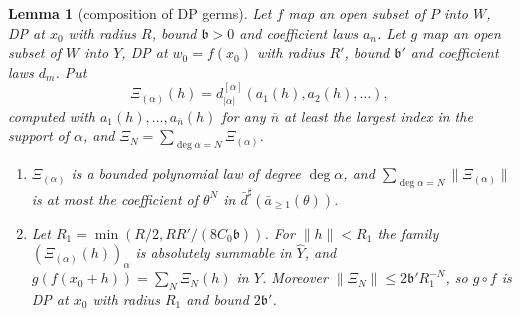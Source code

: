 \documentclass[11pt]{amsart}
\newtheorem{lemma}[theorem]{Lemma}
\theoremstyle{definition}
\theoremstyle{remark}
\numberwithin{equation}{section}
\newcommand{\abs}[1]{\lvert #1\rvert}
\newcommand{\norm}[1]{\lVert #1\rVert}
\theoremstyle{plain}
\theoremstyle{definition}
\theoremstyle{plain}
\begin{document}
\begin{lemma}[composition of DP germs]\label{amb:lem:composition}
Let $f$ map an open subset of $P$ into $W$, DP at $x_0$ with radius $R$, bound $\mathfrak b>0$ and coefficient laws $a_n$. Let $g$ map an open subset of $W$ into $Y$, DP at $w_0=f(x_0)$ with radius $R'$, bound $\mathfrak b'$ and coefficient laws $d_m$. Put
\[
 \Xi_{(\alpha)}(h)=d_{\abs\alpha}^{[\alpha]}(a_1(h),a_2(h),\dots),
\]
computed with $a_1(h),\dots,a_{\overline n}(h)$ for any $\overline n$ at least the largest index in the support of $\alpha$, and $\Xi_N=\sum_{\deg\alpha=N}\Xi_{(\alpha)}$.
\begin{enumerate}
\item $\Xi_{(\alpha)}$ is a bounded polynomial law of degree $\deg\alpha$, and $\sum_{\deg\alpha=N}\norm{\Xi_{(\alpha)}}$ is at most the coefficient of $\theta^N$ in $\bar d^\sharp(\bar a_{\ge1}(\theta))$.
\item Let $R_1=\min(R/2,RR'/(8C_0\mathfrak b))$. For $\norm h<R_1$ the family $(\Xi_{(\alpha)}(h))_\alpha$ is absolutely summable in $\widehat Y$, and $g(f(x_0+h))=\sum_N\Xi_N(h)$ in $Y$. Moreover $\norm{\Xi_N}\le2\mathfrak b'R_1^{-N}$, so $g\circ f$ is DP at $x_0$ with radius $R_1$ and bound $2\mathfrak b'$.
\end{enumerate}
\end{lemma}
\end{document}
